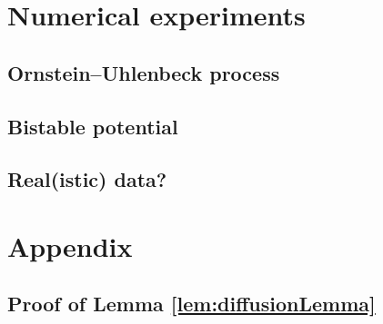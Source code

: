 \documentclass[10pt]{article}
\begin{document}
\section{Numerical experiments}

\subsection{Ornstein--Uhlenbeck process}

\subsection{Bistable potential}

\subsection{Real(istic) data?}

\section*{Appendix}

\subsection*{Proof of Lemma \ref{lem:diffusionLemma}}
\end{document}
